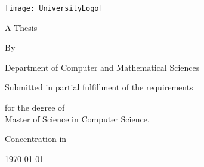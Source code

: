 \begin{titlepage}
  \begin{center}
    
    \vfill
    \texttt{[image: UniversityLogo]}
    
    \vspace{3cm}
    \large
    \textbf{\paperTitle}

    \vspace{0.5cm}
    A Thesis

    \vspace{0.5cm}
    By

    \vspace{0.5cm}
    \textbf{\paperAuthor}

    \vspace{2cm}
    Department of Computer and Mathematical Sciences

    \vspace{0.5cm}
    Submitted in partial fulfillment of the requirements

    \vspace{0.5cm}
    for the degree of \\
    Master of Science in Computer Science, 

    \vspace{0.5cm}
    Concentration in \authorConcentration

    \vspace{2cm}
    \today
          
  \end{center}
\end{titlepage}
